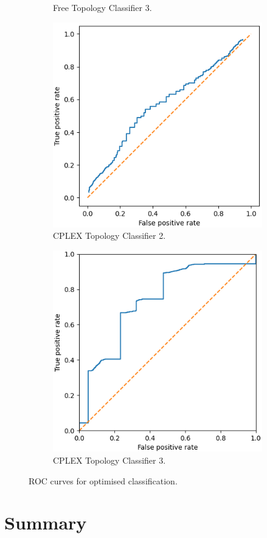 \begin{figure}[H]
\begin{subfigure}[H]{0.475\textwidth}
        \caption{Free Topology Classifier 3.}
    \end{subfigure}
    \begin{subfigure}[H]{0.475\textwidth}
        \includegraphics[width=\textwidth]{figs/results/metric_normilisation/norway_ac2.png}
        \caption{CPLEX Topology Classifier 2.}
    \end{subfigure}
    \begin{subfigure}[H]{0.475\textwidth}
        \includegraphics[width=\textwidth]{figs/results/metric_normilisation/norway_ac3.png}
        \caption{CPLEX Topology Classifier 3.}
    \end{subfigure}
    \caption{ROC curves for optimised classification.}
    \label{fig:RmetricnormROCcurves}
\end{figure}

\section{Summary}

